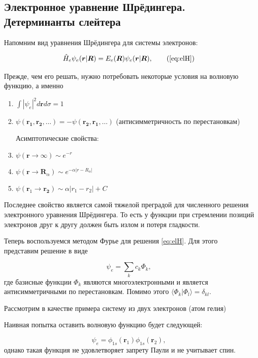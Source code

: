 \documentclass[12pt, oneside]{article}
\numberwithin{equation}{section}  %
\begin{document}
\subsection{Электронное уравнение Шрёдингера. Детерминанты слейтера}

Напомним вид уравнения Шрёдингера для системы электронов:

\[
\hat{H}_e \psi_e (\bm{r}| \bm{R} ) = E_e (\bm{R}) \psi_e (\bm{r}| \bm{R}), \tag{\ref{eq:elH}}
\]

Прежде, чем его решать, нужно потребовать некоторые условия на волновую функцию, а именно

\begin{enumerate}[label=\arabic*)]
\item \(\int |\psi_e|^2 d\bm{r}d\sigma = 1\)
\item \(\psi(\bm{r_1}, \bm{r_2}, \dots) = - \psi(\bm{r_2}, \bm{r_1}, \dots)\) (антисимметричность по перестановкам)

Асимптотические свойства:



\item \(\psi(\bm{r} \rightarrow \infty) \sim e ^{-r}\)
\item \(\psi(\bm{r} \rightarrow \bm{R}_\alpha) \sim e ^{- \alpha |r - R_\alpha|}\)
\item \(\psi(\bm{r}_1 \rightarrow \bm{r_2}) \sim \alpha |r_1 - r_2| + C\)
\end{enumerate}

Последнее свойство является самой тяжелой преградой для численного решения электронного уравнения Шрёдингера. То есть у функции при стремлении позиций электронов друг к другу должен быть излом и потеря гладкости.

Теперь воспользуемся методом Фурье для решения \eqref{eq:elH}. Для этого представим решение в виде

\begin{equation}
    \psi_e = \sum_k c_k \Phi_k,
\end{equation}
где базисные функции \(\Phi_k\) являются многоэлектронными и является антисимметричными по перестановкам. Помимо этого \(\langle \Phi_k | \Phi_l \rangle = \delta_{kl}\).

Рассмотрим в качестве примера систему из двух электронов (атом гелия)

Наивная попытка оставить волновую функцию будет следующей:

\begin{equation}
    \psi_e = \phi_{1s}(\bm{r}_1) \phi_{1s}(\bm{r}_2),
    \label{eq:psi_e_naive}
\end{equation}
однако такая функция не удовлетворяет запрету Паули и не учитывает спин.
\end{document}

